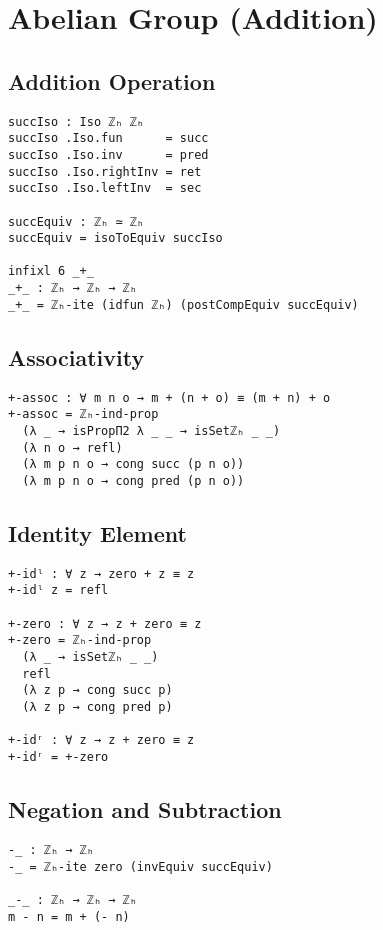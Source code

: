 \chapter{Abelian Group (Addition)}
\label{ch:abgroup}

\section{Addition Operation}
\begin{verbatim}
succIso : Iso ℤₕ ℤₕ
succIso .Iso.fun      = succ
succIso .Iso.inv      = pred
succIso .Iso.rightInv = ret
succIso .Iso.leftInv  = sec

succEquiv : ℤₕ ≃ ℤₕ
succEquiv = isoToEquiv succIso

infixl 6 _+_
_+_ : ℤₕ → ℤₕ → ℤₕ
_+_ = ℤₕ-ite (idfun ℤₕ) (postCompEquiv succEquiv)
\end{verbatim}

\section{Associativity}
\begin{verbatim}
+-assoc : ∀ m n o → m + (n + o) ≡ (m + n) + o
+-assoc = ℤₕ-ind-prop
  (λ _ → isPropΠ2 λ _ _ → isSetℤₕ _ _)
  (λ n o → refl)
  (λ m p n o → cong succ (p n o))
  (λ m p n o → cong pred (p n o))
\end{verbatim}

\section{Identity Element}
\begin{verbatim}
+-idˡ : ∀ z → zero + z ≡ z
+-idˡ z = refl

+-zero : ∀ z → z + zero ≡ z
+-zero = ℤₕ-ind-prop
  (λ _ → isSetℤₕ _ _)
  refl
  (λ z p → cong succ p)
  (λ z p → cong pred p)

+-idʳ : ∀ z → z + zero ≡ z
+-idʳ = +-zero
\end{verbatim}

\section{Negation and Subtraction}
\begin{verbatim}
-_ : ℤₕ → ℤₕ
-_ = ℤₕ-ite zero (invEquiv succEquiv)

_-_ : ℤₕ → ℤₕ → ℤₕ
m - n = m + (- n)
\end{verbatim}

